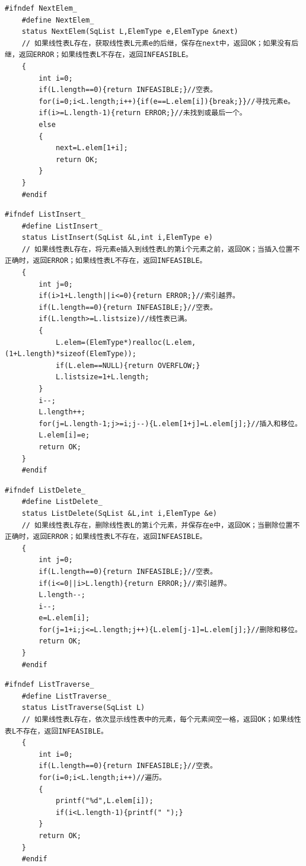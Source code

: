 \documentclass[supercite]{Experimental_Report}
\theoremstyle{definition}
\begin{document}
\begin{lstlisting}[title =获取前驱元素,frame=none]
	#ifndef NextElem_
	#define NextElem_
	status NextElem(SqList L,ElemType e,ElemType &next)
	// 如果线性表L存在，获取线性表L元素e的后继，保存在next中，返回OK；如果没有后继，返回ERROR；如果线性表L不存在，返回INFEASIBLE。
	{
		int i=0;
		if(L.length==0){return INFEASIBLE;}//空表。 
		for(i=0;i<L.length;i++){if(e==L.elem[i]){break;}}//寻找元素e。 
		if(i>=L.length-1){return ERROR;}//未找到或最后一个。 
		else
		{
			next=L.elem[1+i];
			return OK;
		}
	}
	#endif
\end{lstlisting}
\begin{lstlisting}[title =插入元素,frame=none]
	#ifndef ListInsert_
	#define ListInsert_
	status ListInsert(SqList &L,int i,ElemType e)
	// 如果线性表L存在，将元素e插入到线性表L的第i个元素之前，返回OK；当插入位置不正确时，返回ERROR；如果线性表L不存在，返回INFEASIBLE。
	{
		int j=0;
		if(i>1+L.length||i<=0){return ERROR;}//索引越界。 
		if(L.length==0){return INFEASIBLE;}//空表。 
		if(L.length>=L.listsize)//线性表已满。 
		{
			L.elem=(ElemType*)realloc(L.elem,(1+L.length)*sizeof(ElemType));
			if(L.elem==NULL){return OVERFLOW;}
			L.listsize=1+L.length;
		}
		i--;
		L.length++;
		for(j=L.length-1;j>=i;j--){L.elem[1+j]=L.elem[j];}//插入和移位。 
		L.elem[i]=e;
		return OK;
	}
	#endif
\end{lstlisting}
\begin{lstlisting}[title =删除元素,frame=none]
	#ifndef ListDelete_
	#define ListDelete_
	status ListDelete(SqList &L,int i,ElemType &e)
	// 如果线性表L存在，删除线性表L的第i个元素，并保存在e中，返回OK；当删除位置不正确时，返回ERROR；如果线性表L不存在，返回INFEASIBLE。
	{
		int j=0;
		if(L.length==0){return INFEASIBLE;}//空表。 
		if(i<=0||i>L.length){return ERROR;}//索引越界。 
		L.length--;
		i--;
		e=L.elem[i];
		for(j=1+i;j<=L.length;j++){L.elem[j-1]=L.elem[j];}//删除和移位。 
		return OK;
	}
	#endif
\end{lstlisting}
\begin{lstlisting}[title =遍历线性表,frame=none]
	#ifndef ListTraverse_
	#define ListTraverse_
	status ListTraverse(SqList L)
	// 如果线性表L存在，依次显示线性表中的元素，每个元素间空一格，返回OK；如果线性表L不存在，返回INFEASIBLE。
	{
		int i=0;
		if(L.length==0){return INFEASIBLE;}//空表。 
		for(i=0;i<L.length;i++)//遍历。 
		{
			printf("%d",L.elem[i]);
			if(i<L.length-1){printf(" ");}
		}
		return OK;
	}
	#endif
\end{lstlisting}
\end{document}
